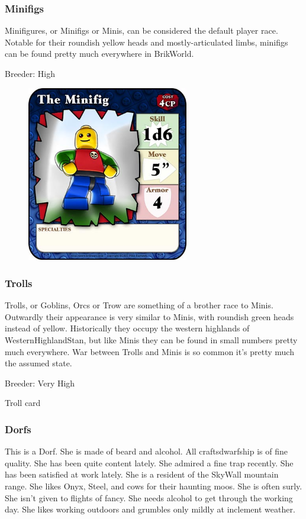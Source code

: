 \documentclass[12pt,a4paper,twocolumn]{article}
\begin{document}
\subsubsection{Minifigs}

Minifigures, or Minifigs or Minis, can be considered the default player race.  Notable for their roundish yellow heads and mostly-articulated limbs, minifigs can be found pretty much everywhere in BrikWorld.  

Breeder: High

\begin{figure}[h]
\includegraphics[width=2.78in]{minifig_color.jpg}
\end{figure}

\subsubsection{Trolls}

Trolls, or Goblins, Orcs or Trow are something of a brother race to Minis.  Outwardly their appearance is very similar to Minis, with roundish green heads instead of yellow.  Historically they occupy the western highlands of WesternHighlandStan, but like Minis they can be found in small numbers pretty much everywhere.  War between Trolls and Minis is so common it's pretty much the assumed state.

Breeder: Very High

Troll card

\subsubsection{Dorfs}

This is a Dorf.  She is made of beard and alcohol.  All craftsdwarfship is of fine quality.  She has been quite content lately.  She admired a fine trap recently.  She has been satisfied at work lately.  She is a resident of the SkyWall mountain range.  She likes Onyx, Steel, and cows for their haunting moos.  She is often surly.  She isn't given to flights of  fancy.  She needs alcohol to get through the working day.  She likes working outdoors and grumbles only mildly at inclement weather.
\end{document}
